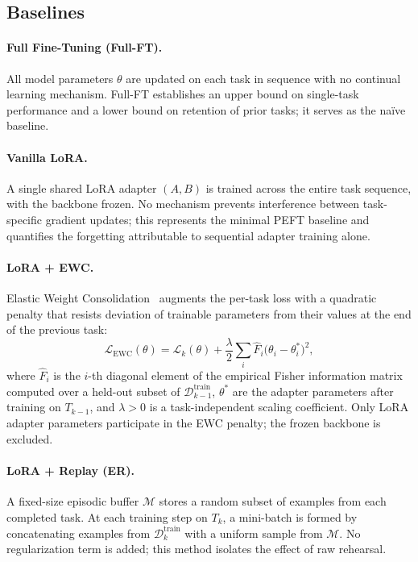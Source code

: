 \subsection{Baselines}

\paragraph{Full Fine-Tuning (Full-FT).}
All model parameters $\theta$ are updated on each task in sequence with no continual learning
mechanism.
Full-FT establishes an upper bound on single-task performance and a lower bound on retention of
prior tasks; it serves as the na\"{i}ve baseline.

\paragraph{Vanilla LoRA.}
A single shared LoRA adapter $(A, B)$ is trained across the entire task sequence, with the backbone
frozen.
No mechanism prevents interference between task-specific gradient updates; this represents the
minimal PEFT baseline and quantifies the forgetting attributable to sequential adapter training
alone.

\paragraph{LoRA + EWC.}
Elastic Weight Consolidation~\cite{kirkpatrick2017overcoming} augments the per-task loss with a
quadratic penalty that resists deviation of trainable parameters from their values at the end of
the previous task:
\begin{equation}
  \mathcal{L}_{\mathrm{EWC}}(\theta)
    = \mathcal{L}_k(\theta)
    + \frac{\lambda}{2} \sum_{i}
        \hat{F}_i \bigl(\theta_i - \theta_i^*\bigr)^2,
  \label{eq:ewc}
\end{equation}
where $\hat{F}_i$ is the $i$-th diagonal element of the empirical Fisher information matrix
computed over a held-out subset of $\mathcal{D}_{k-1}^{\mathrm{train}}$, $\theta^*$ are the
adapter parameters after training on $T_{k-1}$, and $\lambda > 0$ is a task-independent scaling
coefficient.
Only LoRA adapter parameters participate in the EWC penalty; the frozen backbone is excluded.

\paragraph{LoRA + Replay (ER).}
A fixed-size episodic buffer $\mathcal{M}$ stores a random subset of examples from each completed
task.
At each training step on $T_k$, a mini-batch is formed by concatenating examples from
$\mathcal{D}_k^{\mathrm{train}}$ with a uniform sample from $\mathcal{M}$.
No regularization term is added; this method isolates the effect of raw rehearsal.

